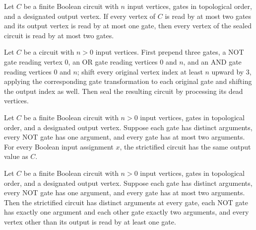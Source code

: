 \begin{theorem}
\label{BoolCircuit.DAGCircuit.seal_hasFanoutTwo}
\leanok
{}
Let $C$ be a finite Boolean circuit with $n$ input vertices, gates in topological order,
and a designated output vertex. If every vertex of $C$ is read by at most two gates and
its output vertex is read by at most one gate, then every vertex of the sealed circuit
is read by at most two gates.
\end{theorem}

\begin{definition}
\label{BoolCircuit.DAGCircuit.strictify}
\leanok
{}
Let $C$ be a circuit with $n>0$ input vertices. First prepend three gates, a NOT gate
reading vertex $0$, an OR gate reading vertices $0$ and $n$, and an AND gate reading
vertices $0$ and $n$; shift every original vertex index at least $n$ upward by $3$,
applying the corresponding gate transformation to each original gate and shifting the
output index as well. Then seal the resulting circuit by processing its dead vertices.
\end{definition}

\begin{theorem}
\label{BoolCircuit.DAGCircuit.strictify_eval}
\leanok
{}
Let $C$ be a finite Boolean circuit with $n>0$ input vertices, gates in topological
order, and a designated output vertex. Suppose each gate has distinct arguments, every
NOT gate has one argument, and every gate has at most two arguments. For every Boolean
input assignment $x$, the strictified circuit has the same output value as $C$.
\end{theorem}

\begin{theorem}
\label{BoolCircuit.DAGCircuit.strictify_isStrict}
\leanok
{}
Let $C$ be a finite Boolean circuit with $n>0$ input vertices, gates in topological
order, and a designated output vertex. Suppose each gate has distinct arguments, every
NOT gate has one argument, and every gate has at most two arguments. Then the
strictified circuit has distinct arguments at every gate, each NOT gate has exactly one
argument and each other gate exactly two arguments, and every vertex other than its
output is read by at least one gate.
\end{theorem}


